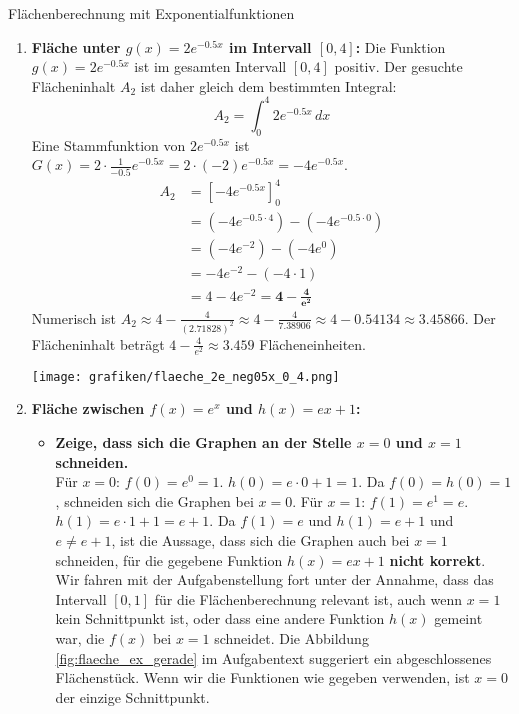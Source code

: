 \begin{loesungsumgebung}{Flächenberechnung mit Exponentialfunktionen}
\begin{enumerate}[label=(\alph*)]
    \item \textbf{Fläche unter $g(x) = 2e^{-0.5x}$ im Intervall $[0, 4]$:}
    Die Funktion $g(x)=2e^{-0.5x}$ ist im gesamten Intervall $[0,4]$ positiv. Der gesuchte Flächeninhalt $A_2$ ist daher gleich dem bestimmten Integral:
    $$ A_2 = \int_0^4 2e^{-0.5x} \,dx $$
    Eine Stammfunktion von $2e^{-0.5x}$ ist $G(x) = 2 \cdot \frac{1}{-0.5}e^{-0.5x} = 2 \cdot (-2)e^{-0.5x} = -4e^{-0.5x}$.
    \begin{align*}
    A_2 &= [-4e^{-0.5x}]_0^4 \\
        &= (-4e^{-0.5 \cdot 4}) - (-4e^{-0.5 \cdot 0}) \\
        &= (-4e^{-2}) - (-4e^0) \\
        &= -4e^{-2} - (-4 \cdot 1) \\
        &= 4 - 4e^{-2} = \mathbf{4 - \frac{4}{e^2}}
    \end{align*}
    Numerisch ist $A_2 \approx 4 - \frac{4}{(2.71828)^2} \approx 4 - \frac{4}{7.38906} \approx 4 - 0.54134 \approx 3.45866$.
    Der Flächeninhalt beträgt $4 - \frac{4}{e^2} \approx 3.459$ Flächeneinheiten.
    \begin{center}
    \texttt{[image: grafiken/flaeche\_2e\_neg05x\_0\_4.png]}
    \label{fig:flaeche_2e_neg05x_0_4}
    \end{center}

    \item \textbf{Fläche zwischen $f(x) = e^x$ und $h(x) = ex + 1$:}
    \begin{itemize}
        \item \textbf{Zeige, dass sich die Graphen an der Stelle $x=0$ und $x=1$ schneiden.} \\
        Für $x=0$:
        $f(0) = e^0 = 1$.
        $h(0) = e \cdot 0 + 1 = 1$.
        Da $f(0)=h(0)=1$, schneiden sich die Graphen bei $x=0$.
        Für $x=1$:
        $f(1) = e^1 = e$.
        $h(1) = e \cdot 1 + 1 = e+1$.
        Da $f(1) = e$ und $h(1) = e+1$ und $e \neq e+1$, ist die Aussage, dass sich die Graphen auch bei $x=1$ schneiden, für die gegebene Funktion $h(x)=ex+1$ \textbf{nicht korrekt}.
        Wir fahren mit der Aufgabenstellung fort unter der Annahme, dass das Intervall $[0,1]$ für die Flächenberechnung relevant ist, auch wenn $x=1$ kein Schnittpunkt ist, oder dass eine andere Funktion $h(x)$ gemeint war, die $f(x)$ bei $x=1$ schneidet. Die Abbildung \ref{fig:flaeche_ex_gerade} im Aufgabentext suggeriert ein abgeschlossenes Flächenstück. Wenn wir die Funktionen wie gegeben verwenden, ist $x=0$ der einzige Schnittpunkt.


\end{itemize}
\end{enumerate}
\end{loesungsumgebung}
